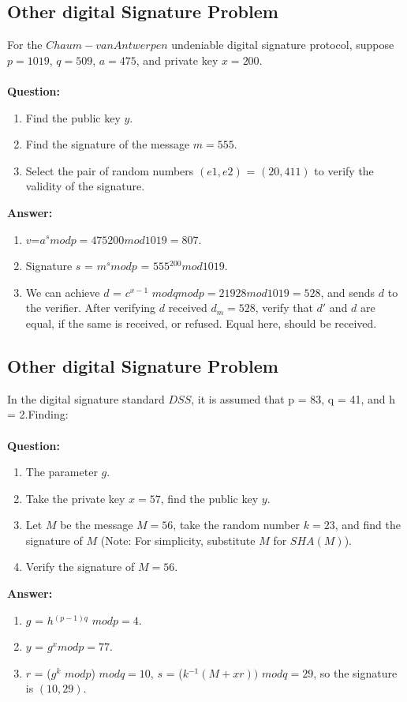 \documentclass[paper=a4, fontsize=11pt]{scrartcl} %
\numberwithin{equation}{section} %
\numberwithin{figure}{section} %
\numberwithin{table}{section} %
\begin{document}
\subsection{Other digital Signature Problem \uppercase\expandafter{}}

For the $Chaum-van Antwerpen$ undeniable digital signature protocol, suppose $p = 1019$, $q = 509$, $a = 475$, and private key $x = 200$.
\\
\\
\textbf{Question:}
\begin{enumerate}
\item Find the public key $y$.
\item Find the signature of the message $m = 555$.
\item Select the pair of random numbers $(e1, e2)$ = $(20, 411)$ to verify the validity of the signature.
\end{enumerate}

\textbf{Answer:}
\begin{enumerate}
\item $v$=$a^s mod p=475200 mod 1019=807$.
\item Signature $s$ = $m^s mod p$ = $555$$^{200} mod 1019$.
\item We can achieve $d$ = $c$$^{x-1}$ $mod q mod p = 21928 mod 1019 = 528$, and sends $d$ to the verifier. After verifying $d$ received $d$$_m  = 528$, verify that $d'$ and $d$ are equal, if the same is received, or refused. Equal here, should be received.
\end{enumerate}


\subsection{Other digital Signature Problem \uppercase\expandafter{}}

In the digital signature standard $DSS$, it is assumed that p = 83, q = 41, and h = 2.Finding:
\\
\\
\textbf{Question:}
\begin{enumerate}
\item The parameter $g$.
\item Take the private key $x = 57$, find the public key $y$.
\item Let $M$ be the message $M = 56$, take the random number $k = 23$, and find the signature of $M$ (Note: For simplicity, substitute $M$ for $SHA(M)$).
\item Verify the signature of $M = 56$.
\end{enumerate}

\textbf{Answer:}
\begin{enumerate}
\item $g$ = $h$$^{(p-1)q}$ $mod p = 4$.
\item $y$ = $g^x mod p = 77$.
\item $r$ = ($g^k$ $mod p$) $mod q = 10$, $s$ = ($k$$^{-1} (M + xr))$ $mod q = 29$, so the signature is $(10, 29)$.
\end{enumerate}
\end{document}
